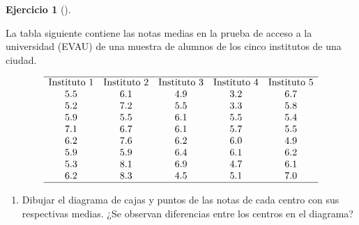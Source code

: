 \documentclass[
  a4paper,
]{scrreport}
\providecommand{\tightlist}{%
  \setlength{\itemsep}{0pt}\setlength{\parskip}{0pt}}\usepackage{longtable,booktabs,array}
\theoremstyle{definition}
\newtheorem{exercise}{Ejercicio}[chapter]
\theoremstyle{remark}
\begin{document}
\begin{exercise}[]\protect\hypertarget{exr-anova-un-factor-evau}{}\label{exr-anova-un-factor-evau}

La tabla siguiente contiene las notas medias en la prueba de acceso a la
universidad (EVAU) de una muestra de alumnos de los cinco institutos de
una ciudad.

\[
\begin{array}{ccccc}
\hline
\mbox{Instituto 1} & \mbox{Instituto 2} & \mbox{Instituto 3} & \mbox{Instituto 4} & \mbox{Instituto 5} \\
5.5 & 6.1 & 4.9 & 3.2 & 6.7 \\
5.2 & 7.2 & 5.5 & 3.3 & 5.8 \\
5.9 & 5.5 & 6.1 & 5.5 & 5.4 \\
7.1 & 6.7 & 6.1 & 5.7 & 5.5 \\
6.2 & 7.6 & 6.2 & 6.0 & 4.9 \\
5.9 & 5.9 & 6.4 & 6.1 & 6.2 \\
5.3 & 8.1 & 6.9 & 4.7 & 6.1 \\
6.2 & 8.3 & 4.5 & 5.1 & 7.0 \\
\hline
\end{array}
\]

\begin{enumerate}
\def\labelenumi{\alph{enumi}.}
\tightlist
\item
  Dibujar el diagrama de cajas y puntos de las notas de cada centro con
  sus respectivas medias. ¿Se observan diferencias entre los centros en
  el diagrama?
\end{enumerate}

\end{exercise}
\end{document}
